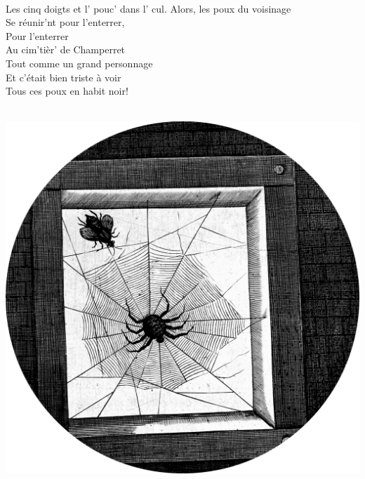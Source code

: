 \\Les cinq doigts et l' pouc' dans l' cul.
\breakpage
Alors, les poux du voisinage
\\Se réunir'nt pour l'enterrer,
\\Pour l'enterrer
\\Au cim'tièr' de Champerret
\\Tout comme un grand personnage
\\Et c'était bien triste à voir
\\Tous ces poux en habit noir!
\\\\
\bigskip
\begin{center}
   \includegraphics[width=1\textwidth]{images/brev32.png}
 \end{center}


\breakpage